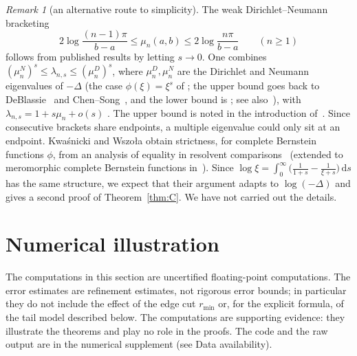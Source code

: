 \documentclass[11pt]{amsart}
\newcommand{\dd}{\,\mathrm{d}}
\theoremstyle{definition}
\theoremstyle{remark}
\newtheorem{remark}[theorem]{Remark}
\numberwithin{equation}{section}
\begin{document}
\begin{remark}[an alternative route to simplicity]\label{rem:KW}
The weak Dirichlet--Neumann bracketing
\[
2\log\frac{(n-1)\pi}{b-a}\le\mu_n(a,b)\le2\log\frac{n\pi}{b-a}\qquad(n\ge1)
\]
follows from published results by letting $s\to0$. One combines $(\mu_n^{N})^s\le\lambda_{n,s}\le(\mu_n^{D})^s$, where $\mu_n^{D},\mu_n^{N}$ are the Dirichlet and Neumann eigenvalues of $-\Delta$ (the case $\phi(\xi)=\xi^s$ of \cite[Thm.~1.1]{KW26}; the upper bound goes back to DeBlassie~\cite{DeB04} and Chen--Song~\cite{CS05}, and the lower bound is \cite[Thm.~3]{Naz22}; see also~\cite{MN14}), with $\lambda_{n,s}=1+s\mu_n+o(s)$ \cite[Thm.~1.1]{FJW22}. The upper bound is noted in the introduction of~\cite{LW21}. Since consecutive brackets share endpoints, a multiple eigenvalue could only sit at an endpoint. Kwa\'snicki and Wszo{\l}a obtain strictness, for complete Bernstein functions $\phi$, from an analysis of equality in resolvent comparisons~\cite{KW26} (extended to meromorphic complete Bernstein functions in~\cite{Ch26}). Since $\log\xi=\int_0^\infty\bigl(\frac1{1+s}-\frac1{\xi+s}\bigr)\dd s$ has the same structure, we expect that their argument adapts to $\log(-\Delta)$ and gives a second proof of Theorem~\ref{thm:C}. We have not carried out the details.
\end{remark}

\section{Numerical illustration}\label{sec:numerics}

The computations in this section are uncertified floating-point computations. The error estimates are refinement estimates, not rigorous error bounds; in particular they do not include the effect of the edge cut $r_{\min}$ or, for the explicit formula, of the tail model described below. The computations are supporting evidence: they illustrate the theorems and play no role in the proofs. The code and the raw output are in the numerical supplement (see Data availability).
\end{document}

